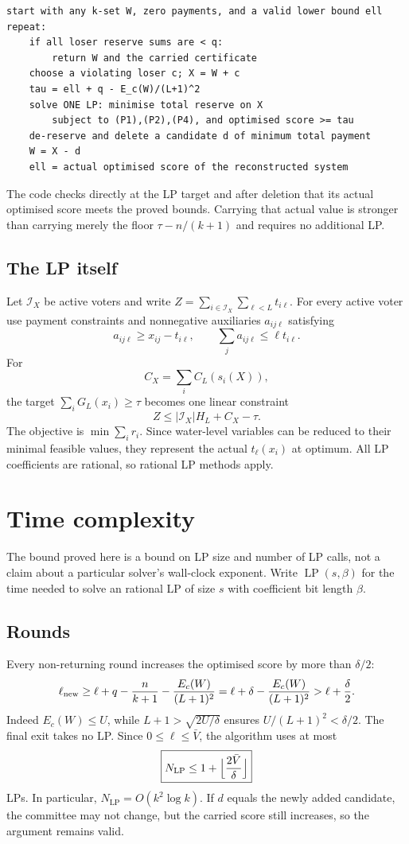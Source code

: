 \documentclass[11pt,a4paper]{article}
\theoremstyle{definition}
\theoremstyle{remark}
\newcommand{\barV}{\bar V}
\newcommand{\LP}{\operatorname{LP}}
\begin{document}
\begin{lstlisting}[style=plaincode,caption={One-LP-per-repair algorithm}]
start with any k-set W, zero payments, and a valid lower bound ell
repeat:
    if all loser reserve sums are < q:
        return W and the carried certificate
    choose a violating loser c; X = W + c
    tau = ell + q - E_c(W)/(L+1)^2
    solve ONE LP: minimise total reserve on X
        subject to (P1),(P2),(P4), and optimised score >= tau
    de-reserve and delete a candidate d of minimum total payment
    W = X - d
    ell = actual optimised score of the reconstructed system
\end{lstlisting}
The code checks directly at the LP target and after deletion that its actual optimised score meets the proved bounds. Carrying that actual value is stronger than carrying merely the floor $\tau-n/(k+1)$ and requires no additional LP.

\subsection{The LP itself}
Let $\mathcal I_X$ be active voters and write $Z=\sum_{i\in\mathcal I_X}\sum_{\ell<L}t_{i\ell}$. For every active voter use payment constraints and nonnegative auxiliaries $a_{ij\ell}$ satisfying
\[
a_{ij\ell}\ge x_{ij}-t_{i\ell},\qquad
\sum_ja_{ij\ell}\le\ell t_{i\ell}.
\]
For
\[
C_X=\sum_i C_L(s_i(X)),
\]
the target $\sum_iG_L(x_i)\ge\tau$ becomes one linear constraint
\[
Z\le|\mathcal I_X|H_L+C_X-\tau.
\]
The objective is $\min\sum_ir_i$. Since water-level variables can be reduced to their minimal feasible values, they represent the actual $t_\ell(x_i)$ at optimum. All LP coefficients are rational, so rational LP methods apply.

\section{Time complexity}
The bound proved here is a bound on LP size and number of LP calls, not a claim about a particular solver's wall-clock exponent. Write $\LP(s,\beta)$ for the time needed to solve an rational LP of size $s$ with coefficient bit length $\beta$.

\subsection{Rounds}
Every non-returning round increases the optimised score by more than $\delta/2$:
\[
\ell_{\rm new}
\ge \ell+q-\frac n{k+1}-\frac{E_c(W)}{(L+1)^2}
=\ell+\delta-\frac{E_c(W)}{(L+1)^2}
>\ell+\frac\delta2.
\]
Indeed $E_c(W)\le U$, while $L+1>\sqrt{2U/\delta}$ ensures $U/(L+1)^2<\delta/2$. The final exit takes no LP. Since $0\le\ell\le\barV$, the algorithm uses at most
\[
\boxed{N_{\LP}\le1+\Bigl\lfloor\frac{2\barV}{\delta}\Bigr\rfloor}
\]
LPs. In particular, $N_{\LP}=O(k^2\log k)$. If $d$ equals the newly added candidate, the committee may not change, but the carried score still increases, so the argument remains valid.
\end{document}
